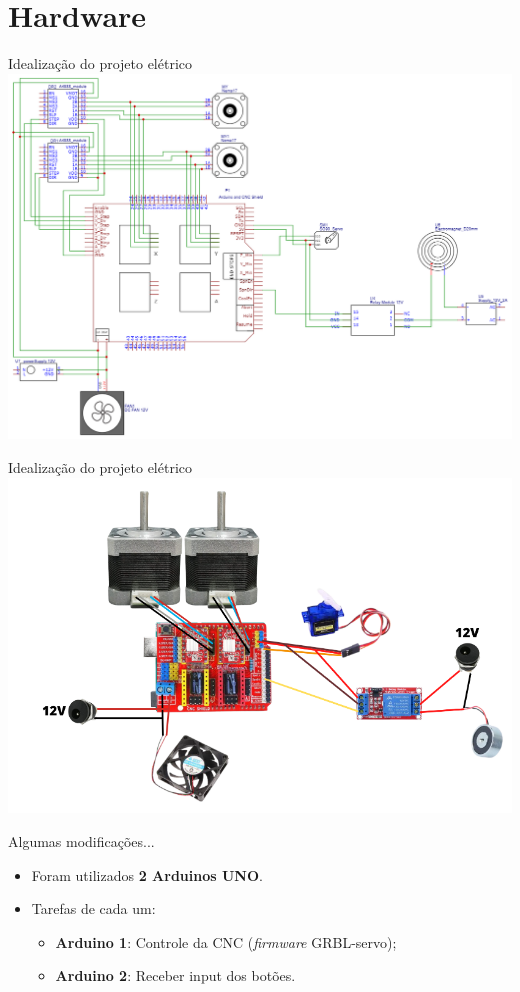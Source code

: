 \documentclass{beamer}
\begin{document}
\section{Hardware}

\begin{frame}[plain]{Idealização do projeto elétrico}
  \centering
  \includegraphics[width=\paperwidth,height=0.9\paperheight,keepaspectratio]{images/projeto_eletrico_png.png}
\end{frame}

\begin{frame}[plain]{Idealização do projeto elétrico}
  \centering
  \includegraphics[width=\paperwidth,height=0.8\paperheight,keepaspectratio]{images/diagramaeletronico.png}
\end{frame}


\begin{frame}[plain]{Algumas modificações...}
\begin{itemize}
    \item Foram utilizados \textbf{2 Arduinos UNO}.
    \item Tarefas de cada um:
    \begin{itemize}
        \item \textbf{Arduino 1}: Controle da CNC (\textit{firmware} GRBL-servo);
        \item \textbf{Arduino 2}: Receber input dos botões.
    \end{itemize}
\end{itemize}
\end{frame}
\end{document}
